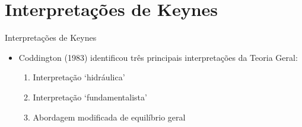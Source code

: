 \documentclass[10pt]{beamer}
\begin{document}
\section{Interpretações de Keynes}
\begin{frame}{Interpretações de Keynes}
    \begin{itemize}
        \item Coddington (1983) identificou três principais interpretações da Teoria Geral:
        \bigskip
        \begin{enumerate}
            \item Interpretação `hidráulica'
            \bigskip
            \item Interpretação `fundamentalista'
            \bigskip
            \item Abordagem modificada de equilíbrio geral
        \end{enumerate}
    \end{itemize}
\end{frame}


\end{document}
